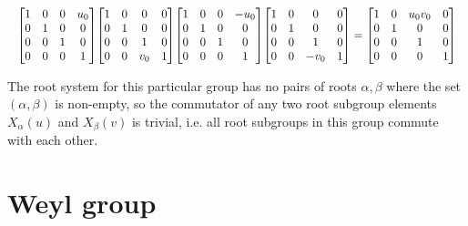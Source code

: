 \documentclass[11pt]{article}
\theoremstyle{definition}
\begin{document}
\[
\scaletoalign{\textwidth}{{\left[\begin{matrix}1 & 0 & 0 & u_{0}\\0 & 1 & 0 & 0\\0 & 0 & 1 & 0\\0 & 0 & 0 & 1\end{matrix}\right]} {\left[\begin{matrix}1 & 0 & 0 & 0\\0 & 1 & 0 & 0\\0 & 0 & 1 & 0\\0 & 0 & v_{0} & 1\end{matrix}\right]} {\left[\begin{matrix}1 & 0 & 0 & - u_{0}\\0 & 1 & 0 & 0\\0 & 0 & 1 & 0\\0 & 0 & 0 & 1\end{matrix}\right]} {\left[\begin{matrix}1 & 0 & 0 & 0\\0 & 1 & 0 & 0\\0 & 0 & 1 & 0\\0 & 0 & - v_{0} & 1\end{matrix}\right]} = {\left[\begin{matrix}1 & 0 & u_{0} v_{0} & 0\\0 & 1 & 0 & 0\\0 & 0 & 1 & 0\\0 & 0 & 0 & 1\end{matrix}\right]}}
\]


\else
The root system for this particular group has no pairs of roots $\alpha, \beta$ where the set $(\alpha, \beta)$ is non-empty, so the commutator of any two root subgroup elements $X_\alpha(u)$ and $X_\beta(v)$ is trivial, i.e. all root subgroups in this group commute with each other.
\fi

\newpage
\section{Weyl group}
\end{document}
